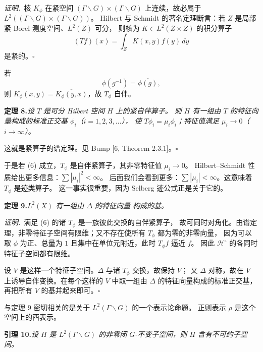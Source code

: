 \smallskip
\noindent\emph{证明.}\ 核 $K_{\phi}$ 在紧空间 $(\Gamma\backslash G)\times(\Gamma\backslash G)$
上连续，故必属于 $L^{2}((\Gamma\backslash G)\times(\Gamma\backslash G))$。
Hilbert 与 Schmidt 的著名定理断言：若 $Z$ 是局部紧 Borel 测度空间、$L^{2}(Z)$ 可分，
则核为 $K\in L^{2}(Z\times Z)$ 的积分算子
\[
(Tf)(x)=\int_{Z}K(x,y)f(y)\,dy
\]
是紧的。\hfill$\square$

若
\begin{equation}\tag{6}
\phi(g^{-1})=\overline{\phi(g)},
\end{equation}
则 $K_{\phi}(x,y)=\overline{K_{\phi}(y,x)}$，故 $T_{\phi}$ 自伴。

\par\medskip\noindent\textbf{定理 8.}\quad\emph{设 $T$ 是可分 Hilbert 空间 $H$ 上的紧自伴算子。
则 $H$ 有一组由 $T$ 的特征向量构成的标准正交基 $\phi_{i}$（$i=1,2,3,\dots$），
使 $T\phi_{i}=\mu_{i}\phi_{i}$；特征值满足 $\mu_{i}\to0$（$i\to\infty$）。}

\smallskip
这就是紧算子的谱定理。见 Bump [6, Theorem 2.3.1]。\hfill$\square$

于是若 (6) 成立，$T_{\phi}$ 是自伴紧算子，其非零特征值 $\mu_{i}\to0$。
Hilbert--Schmidt 性质给出更多信息：$\sum|\mu_{i}|^{2}<\infty$。
后面我们会看到更多：$\sum|\mu_{i}|<\infty$。这意味着 $T_{\phi}$ 是迹类算子。
这一事实很重要，因为 Selberg 迹公式正是关于它的。

\par\medskip\noindent\textbf{定理 9.}\quad\emph{$L^{2}(X)$ 有一组由 $\Delta$ 的特征向量
构成的基。}

\smallskip
\noindent\emph{证明.}\ 满足 (6) 的诸 $T_{\phi}$ 是一族彼此交换的自伴紧算子，
故可同时对角化。由谱定理，非零特征子空间有限维；又不存在使所有 $T_{\phi}$ 都为零的非零向量，
因为可以取 $\phi$ 为正、总量为 $1$ 且集中在单位元附近，此时 $T_{\phi}f$ 逼近 $f$。
因此 $\mathcal{H}^{\circ}$ 的各同时特征子空间都有限维。

设 $V$ 是这样一个特征子空间。$\Delta$ 与诸 $T_{\phi}$ 交换，故保持 $V$；
又 $\Delta$ 对称，故在 $V$ 上诱导自伴变换。在每个这样的 $V$ 中取一组由 $\Delta$
的特征向量构成的标准正交基，再把所有 $V$ 的基并起来即可。\hfill$\square$

与定理 9 密切相关的是关于 $L^{2}(\Gamma\backslash G)$ 的一个表示论命题。
正则表示 $\rho$ 是这个空间上的酉表示。

\par\medskip\noindent\textbf{引理 10.}\quad\emph{设 $H$ 是 $L^{2}(\Gamma\backslash G)$ 的非零闭
$G$-不变子空间，则 $H$ 含有不可约子空间。}

